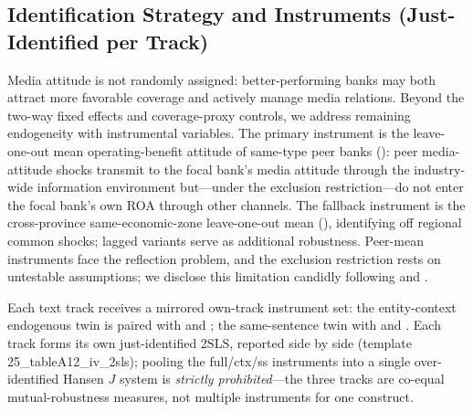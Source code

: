 \subsection{Identification Strategy and Instruments (Just-Identified per Track)}\label{sec:method:iv}
Media attitude is not randomly assigned: better-performing banks may
both attract more favorable coverage and actively manage media
relations. Beyond the two-way fixed effects and coverage-proxy
controls, we address remaining endogeneity with instrumental
variables. The primary instrument is the leave-one-out mean
operating-benefit attitude of same-type peer banks
(): peer media-attitude shocks
transmit to the focal bank's media attitude through the industry-wide
information environment but---under the exclusion restriction---do not
enter the focal bank's own ROA through other channels. The fallback
instrument is the cross-province same-economic-zone leave-one-out mean
(), identifying off regional common
shocks;  lagged variants serve as additional robustness.
Peer-mean instruments face the reflection problem, and the exclusion
restriction rests on untestable assumptions; we disclose this
limitation candidly following \textcite{manski1993reflection} and
\textcite{leary2014peer}.

Each text track receives a mirrored own-track instrument set: the
entity-context endogenous twin  is paired with
 and
; the same-sentence twin
 with  and
. Each track forms its own
just-identified 2SLS, reported side by side (template
25\_tableA12\_iv\_2sls); pooling the full/ctx/ss instruments into a
single over-identified Hansen $J$ system is \emph{strictly
prohibited}---the three tracks are co-equal mutual-robustness measures,
not multiple instruments for one construct.

